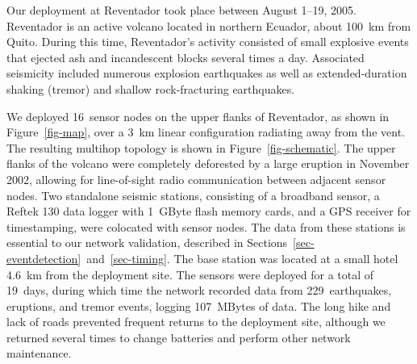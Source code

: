 
Our deployment at Reventador took place between August 1--19, 2005.
Reventador is an active volcano located in northern Ecuador, about 100~km
from Quito. 
During this time, Reventador's activity consisted of small explosive events
that ejected ash and incandescent blocks several times a day. Associated
seismicity included numerous explosion earthquakes as well as
extended-duration shaking (tremor) and shallow rock-fracturing earthquakes.

We deployed 16~sensor nodes on the upper flanks of Reventador, as
shown in Figure~\ref{fig-map}, over a 3~km linear configuration
radiating away from the vent. The resulting multihop topology is shown
in Figure~\ref{fig-schematic}. The upper flanks of the volcano were
completely deforested by a large eruption in November 2002, allowing
for line-of-sight radio communication between adjacent sensor nodes.
Two standalone seismic stations, consisting of a broadband sensor, a
Reftek 130 data logger with 1~GByte flash memory cards, and a GPS
receiver for timestamping, were colocated with sensor nodes. The data
from these stations is essential to our network validation, described
in Sections~\ref{sec-eventdetection}~and~\ref{sec-timing}. The base
station was located at a small hotel 4.6~km from the deployment site.
The sensors were deployed for a total of 19~days, during which time
the network recorded data from 229~earthquakes, eruptions, and tremor
events, logging 107~MBytes of data. The long hike and lack of roads
prevented frequent returns to the deployment site, although we
returned several times to change batteries and perform other network
maintenance.



